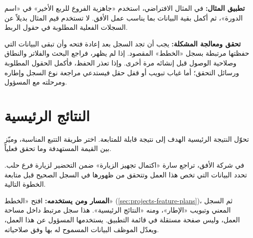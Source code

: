 \textbf{تطبيق المثال:} في المثال الافتراضي، استخدم «جاهزية الفروع للربع الأخير» في «اسم الدورة»، ثم أكمل بقية البيانات بما يناسب عمل الأفق. لا تستخدم قيم المثال بديلاً عن السجلات الفعلية المطلوبة في حقول الربط.

\textbf{تحقق ومعالجة المشكلة:} يجب أن تجد السجل بعد إعادة فتحه وأن تبقى البيانات التي حفظتها مرتبطة بسجل «الخطط» المقصود. إذا لم يظهر، فراجع البحث والفلاتر والنطاق وصلاحية الوصول قبل إنشائه مرة أخرى. وإذا تعذر الحفظ، فأكمل الحقول المطلوبة ورسائل التحقق؛ أما غياب تبويب أو قفل حقل فيستدعي مراجعة نوع السجل وإطاره ومرحلته مع المسؤول.

\clearpage
\section{النتائج الرئيسية}
\label{sec:projects-feature-planning-key-results}

تحوّل النتيجة الرئيسية الهدف إلى نتيجة قابلة للمتابعة. اختر طريقة التتبع المناسبة، وميّز بين القيمة المستهدفة وما تحقق فعلياً.

\begin{rcnote}
في شركة الأفق، تراجع سارة «اكتمال تجهيز الزيارة» ضمن التحضير لزيارة فرع حلب. تحدد البيانات التي تخص هذا العمل وتتحقق من ظهورها في السجل الصحيح قبل متابعة الخطوة التالية.
\end{rcnote}

\textbf{المسار ومن يستخدمه:} افتح «الخطط» (\ref{sec:projects-feature-plans})، ثم السجل المعني وتبويب «الإطار»، ومنه «النتائج الرئيسية». هذا سجل مرتبط داخل مساحة العمل، وليس صفحة مستقلة في قائمة التطبيق. يستخدمها المسؤول عن هذا العمل، ويعدّل الموظف البيانات المسموح له بها وفق صلاحياته.

